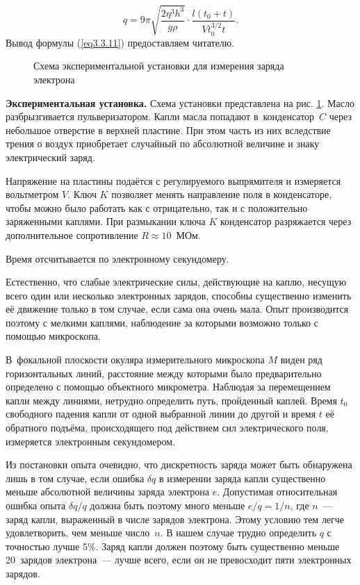 \begin{equation}
q=9\pi\sqrt{\frac{2\eta^3 h^3}{g \rho}}\cdot\frac{l(t_0+t)}{Vt_0^{3/2} t}.
\label{eq3.3.11}
\end{equation}
Вывод формулы (\ref{eq3.3.11}) предоставляем читателю.

\begin{figure}
\caption{Схема экспериментальной установки для измерения заряда электрона}
\label{fig3.3.1}
\end{figure}

{\bf Экспериментальная установка.} Схема установки представлена на рис. \ref{fig3.3.1}. Масло разбрызгивается пульверизатором. Капли масла попадают в~конденсатор~$C$ через небольшое отверстие в верхней пластине. При этом часть из них вследствие трения о воздух приобретает случайный по абсолютной величине и знаку электрический заряд.

Напряжение на пластины подаётся с регулируемого выпрямителя и измеряется вольтметром $V$. Ключ $K$ позволяет менять
направление поля в конденсаторе, чтобы можно было работать  как с отрицательно, так и с положительно заряженными
каплями. При размыкании ключа $K$ конденсатор разряжается через дополнительное сопротивление $R\approx 10$~МОм.

Время отсчитывается по электронному секундомеру.

Естественно, что слабые электрические силы, действующие на каплю, несущую всего
 один или несколько электронных зарядов, способны существенно изменить её движение только в том случае, если сама она очень мала. Опыт производится поэтому с мелкими каплями, наблюдение за которыми возможно только с помощью микроскопа.

В~фокальной плоскости окуляра измерительного микроскопа $M$ виден ряд горизонтальных линий, расстояние между которыми было предварительно определено с помощью объектного микрометра. Наблюдая за перемещением капли между линиями, нетрудно определить путь, пройденный каплей. Время $t_0$ свободного падения капли от одной выбранной линии до другой и время $t$ её обратного подъёма, происходящего под действием сил электрического поля, измеряется электронным секундомером.

Из постановки опыта очевидно, что дискретность заряда может быть обнаружена лишь в том случае, если ошибка $\delta q$ в измерении заряда капли существенно меньше абсолютной величины заряда электрона $e$. Допустимая относительная ошибка опыта $\delta q/q$ должна быть поэтому много меньше $e/q=1/n$, где $n$~--- заряд капли, выраженный в числе зарядов электрона. Этому условию тем легче удовлетворить, чем меньше число~$n$. В нашем случае трудно определить $q$ с точностью лучше 5\%. Заряд капли должен поэтому быть существенно меньше 20~зарядов электрона~--- лучше всего, если он не превосходит пяти электронных зарядов.

